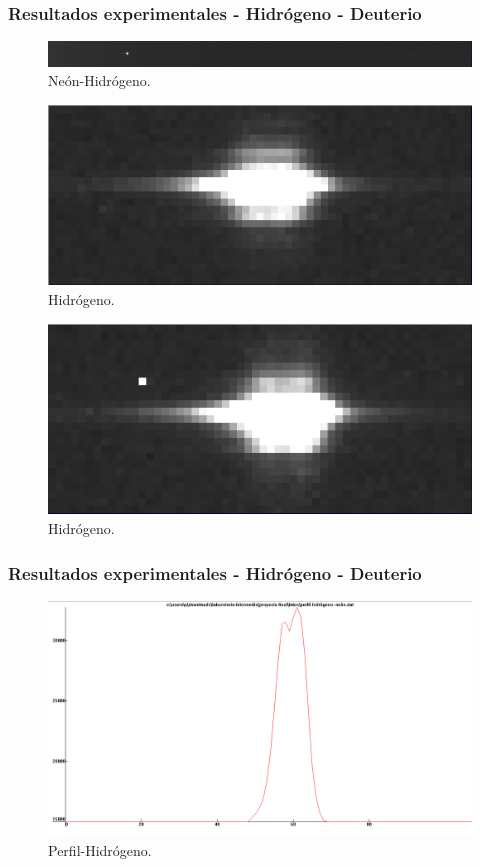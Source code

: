 \documentclass{beamer}
\begin{document}
\begin{frame}[fragile]
	\frametitle{Resultados experimentales - Hidrógeno - Deuterio}
	\begin{figure}[h!]
		\centering
		\includegraphics[width=1.\textwidth,height = 0.1\textheight]{neon-hid}
		\caption{Neón-Hidrógeno.}
	\end{figure}
	
	\begin{figure}[h!]
		\centering
		\includegraphics[width=.7\textwidth,height = 0.1\textheight]{hid}
		\caption{Hidrógeno.}
	\end{figure}
	
	\begin{figure}[h!]
		\centering
		\includegraphics[width=.7\textwidth,height = 0.1\textheight]{deu}
		\caption{Hidrógeno.}
	\end{figure}
\end{frame}

\begin{frame}[fragile]
	\frametitle{Resultados experimentales - Hidrógeno - Deuterio}
	\begin{figure}[h!]
		\centering
		\includegraphics[width=1.\textwidth,height = 0.7\textheight]{perfil-hid}
		\caption{Perfil-Hidrógeno.}
	\end{figure}
	
\end{frame}
\end{document}
